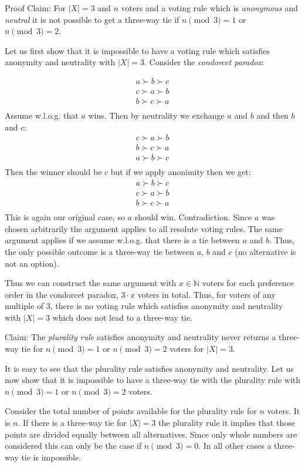 \documentclass[12pt]{article}
\newcommand{\N}{\mathbb{N}}
\newenvironment{answer}[2][Answer]{\begin{trivlist}
\item[\hskip \labelsep {\bfseries #1}\hskip \labelsep {\bfseries #2:}]}{\end{trivlist}}
\begin{document}
\begin{answer}{a)}{Proof}
Claim: For $|X| = 3$ and $n$ voters and a voting rule which is \textit{anonymous} and \textit{neutral} it is not possible to get a three-way tie if $n\pmod 3=1$ or $n\pmod 3=2$.

Let us first show that it is impossible to have a voting rule which satisfies anonymity and neutrality with $|X|=3$. Consider the \textit{condorcet paradox}:

\begin{align*}
a \succ b \succ c \\
c \succ a \succ b \\
b \succ c \succ a \\
\end{align*}
Assume w.l.o.g. that $a$ wins. Then by neutrality we exchange $a$ and $b$ and then $b$ and $c$:
\begin{align*}
c \succ a \succ b \\
b \succ c \succ a \\
a \succ b \succ c \\
\end{align*}
Then the winner should be $c$ but if we apply anonimity then we get:
\begin{align*}
a \succ b \succ c \\
c \succ a \succ b \\
b \succ c \succ a \\
\end{align*}
This is again our original case, so $a$ should win. Contradiction. Since $a$ was chosen arbitrarily the argument applies to all resolute voting rules. The same argument applies if we assume w.l.o.g. that there is a tie between $a$ and $b$. Thus, the only possible outcome is a three-way tie between $a$, $b$ and $c$ (no alternative is not an option).

Thus we can construct the same argument with $x \in \N$ voters for each preference order in the condorcet paradox, $3 \cdot x$ voters in total. Thus, for voters of any multiple of $3$, there is no voting rule which satisfies anonymity and neutrality with $|X|=3$ which does not lead to a three-way tie.

Claim: The \textit{plurality rule} satisfies anonymity and neutrality never returns a three-way tie for $n\pmod 3=1$ or $n\pmod 3=2$ voters for $|X|=3$.

It is easy to see that the plurality rule satisfies anonymity and neutrality. Let us now show that it is impossible to have a three-way tie with the plurality rule with $n\pmod 3=1$ or $n\pmod 3=2$ voters.

Consider the total number of points available for the plurality rule for $n$ voters. It is $n$. If there is a three-way tie for $|X|=3$ the plurality rule it implies that those points are divided equally between all alternatives. Since only whole numbers are considered this can only be the case if $n\pmod 3=0$. In all other cases a three-way tie is impossible.
\end{answer}
\end{document}
